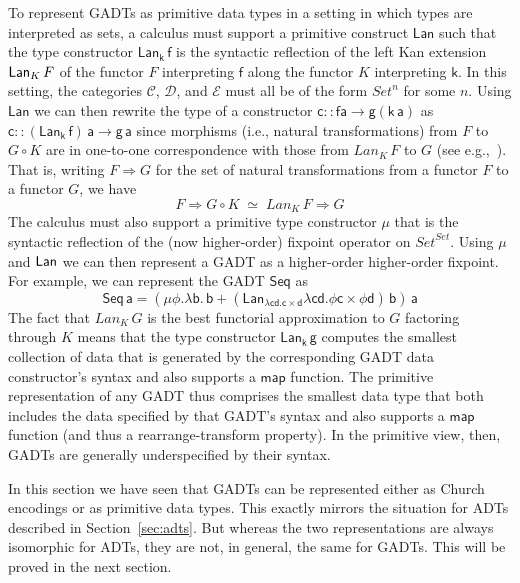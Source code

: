 \documentclass[acmsmall,screen,review,anonymous]{acmart}
\theoremstyle{definition}
\begin{document}
To represent GADTs as primitive data types in a setting in which types
are interpreted as sets, a calculus must support a primitive construct
$\mathsf{Lan}$ such that the type constructor $\mathsf{Lan_k\,f}$ is
the syntactic reflection of the left Kan extension $\mathsf{Lan}_K \,F$ of the
functor $F$ interpreting $\mathsf{f}$ along the functor $K$
interpreting $\mathsf{k}$. In this setting, the categories
$\mathcal{C}$, $\mathcal{D}$, and $\mathcal{E}$ must all be of the form $\mathit{Set}^n$ for some $n$. Using $\mathsf{Lan}$ we can then
rewrite the type of a constructor $\mathsf{c :: f a \to g(k\,a)}$ as
$\mathsf{c :: (Lan_k\,f)\,a \to g\,a}$ since morphisms (i.e., natural
transformations) from $F$ to $G \circ K$ are in one-to-one
correspondence with those from $\mathit{Lan}_K\,F$ to $G$ (see
e.g.,~\cite{rie16}). That is, writing $F \Rightarrow G$ for the set of
natural transformations from a functor $F$ to a functor $G$, we have
\begin{equation}\label{eq:nat-transfs}
F \Rightarrow G \circ K\; \simeq \; Lan_K\,F \Rightarrow G
\end{equation}
The calculus must also support a primitive type
constructor $\mathsf{\mu}$ that is the syntactic reflection of the
(now higher-order) fixpoint operator on
$\mathit{Set}^\mathit{Set}$. Using $\mu$ and $\mathsf{Lan}$ we can then
represent a GADT as a higher-order higher-order fixpoint. For example,
we can represent the GADT $\mathsf{Seq}$ as
\[\mathsf{Seq\,a} = \mathsf{(\mu \phi.\lambda b.\, b + (Lan_{\lambda c
    d. c \times d} \lambda c d. \phi c \times \phi d)\,b)\,a}\] The
fact that $Lan_K\,G$ is the best functorial approximation to $G$
factoring through $K$ means that the type constructor
$\mathsf{Lan_k\,g}$ computes the smallest collection of data that is
generated by the corresponding GADT data constructor's syntax and also
supports a $\mathsf{map}$ function. The primitive representation of
any GADT thus comprises the smallest data type that both includes the
data specified by that GADT's syntax and also supports a
$\mathsf{map}$ function (and thus a rearrange-transform property). In
the primitive view, then, GADTs are generally underspecified by their
syntax.

In this section we have seen that GADTs can be represented either as
Church encodings or as primitive data types. This exactly mirrors the
situation for ADTs described in Section~\ref{sec:adts}. But whereas
the two representations are always isomorphic for ADTs, they are not,
in general, the same for GADTs. This will be proved in the next
section.
\end{document}
